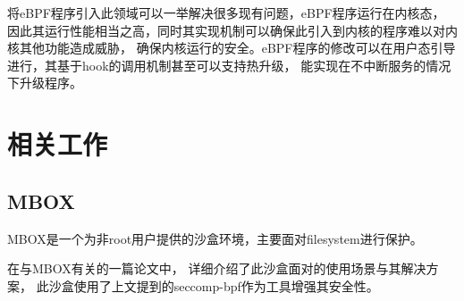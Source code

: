 \documentclass[AutoFakeBold,a4paper]{ctexart}
\begin{document}
将eBPF程序引入此领域可以一举解决很多现有问题，eBPF程序运行在内核态，
因此其运行性能相当之高，同时其实现机制可以确保此引入到内核的程序难以对内核其他功能造成威胁，
确保内核运行的安全。eBPF程序的修改可以在用户态引导进行，其基于hook的调用机制甚至可以支持热升级，
能实现在不中断服务的情况下升级程序。

\section{相关工作}

\subsection{MBOX}
MBOX是一个为非root用户提供的沙盒环境，主要面对filesystem进行保护。

在与MBOX有关的一篇论文\cite{180196}中，
详细介绍了此沙盒面对的使用场景与其解决方案，
此沙盒使用了上文提到的seccomp-bpf作为工具增强其安全性。
\end{document}

